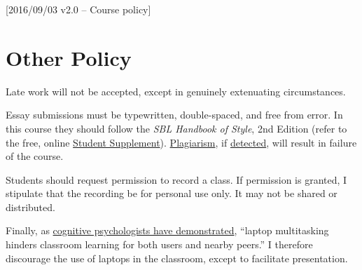 [2016/09/03 v2.0 -- Course policy]

\section{Other Policy}
\label{policy}

Late work will not be accepted, except in genuinely extenuating
circumstances.

Essay submissions must be typewritten, double-spaced, and free from
error. In this course they should follow the \emph{SBL Handbook of Style},
2nd Edition (refer to the free, online \href{https://www.sbl-site.org/assets/pdfs/pubs/SBLHSsupp2015-02.pdf}{Student Supplement}).
\href{http://www.eerdmans.com/Pages/Item/59043/Commentary-Statement.aspx}{Plagiarism},
if \href{https://www.theguardian.com/world/2013/feb/09/german-education-minister-quits-phd-plagiarism}{detected},
will result in failure of the course.

Students should request permission to record a class. If permission is
granted, I stipulate that the recording be for personal use only. It may
not be shared or distributed.

Finally, as \href{http://dx.doi.org/10.1016/j.compedu.2012.10.003}{cognitive
psychologists have demonstrated}, ``laptop multitasking hinders
classroom learning for both users and nearby peers.'' I therefore
discourage the use of laptops in the classroom, except to facilitate
presentation.

